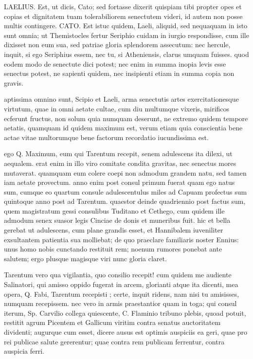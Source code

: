  LAELIUS. Est, ut dicis, Cato; sed fortasse dixerit quispiam tibi propter opes et copias et dignitatem tuam tolerabiliorem senectutem videri, id autem non posse multis contingere. CATO. Est istuc quidem, Laeli, aliquid, sed nequaquam in isto sunt omnia; ut Themistocles fertur Seriphio cuidam in iurgio respondisse, cum ille dixisset non eum sua, sed patriae gloria splendorem assecutum: nec hercule, inquit, si ego Seriphius essem, nec tu, si Atheniensis, clarus umquam fuisses. quod eodem modo de senectute dici potest; nec enim in summa inopia levis esse senectus potest, ne sapienti quidem, nec insipienti etiam in summa copia non gravis.

 aptissima omnino sunt, Scipio et Laeli, arma senectutis artes exercitationesque virtutum, quae in omni aetate cultae, cum diu multumque vixeris, mirificos ecferunt fructus, non solum quia numquam deserunt, ne extremo quidem tempore aetatis, quamquam id quidem maximum est, verum etiam quia conscientia bene actae vitae multorumque bene factorum recordatio iucundissima est.

 ego Q. Maximum, eum qui Tarentum recepit, senem adulescens ita dilexi, ut aequalem. erat enim in illo viro comitate condita gravitas, nec senectus mores mutaverat. quamquam eum colere coepi non admodum grandem natu, sed tamen iam aetate provectum. anno enim post consul primum fuerat quam ego natus sum, cumque eo quartum consule adulescentulus miles ad Capuam profectus sum quintoque anno post ad Tarentum. quaestor deinde quadriennio post factus sum, quem magistratum gessi consulibus Tuditano et Cethego, cum quidem ille admodum senex suasor legis Cinciae de donis et muneribus fuit. hic et bella gerebat ut adulescens, cum plane grandis esset, et Hannibalem iuveniliter exsultantem patientia sua molliebat; de quo praeclare familiaris noster Ennius: unus homo nobis cunctando restituit rem; noenum rumores ponebat ante salutem; ergo plusque magisque viri nunc gloria claret.

 Tarentum vero qua vigilantia, quo consilio recepit! cum quidem me audiente Salinatori, qui amisso oppido fugerat in arcem, glorianti atque ita dicenti, mea opera, Q. Fabi, Tarentum recepisti ; certe, inquit ridens, nam nisi tu amisisses, numquam recepissem. nec vero in armis praestantior quam in toga; qui consul iterum, Sp. Carvilio collega quiescente, C. Flaminio tribuno plebis, quoad potuit, restitit agrum Picentem et Gallicum viritim contra senatus auctoritatem dividenti; augurque cum esset, dicere ausus est optimis auspiciis ea geri, quae pro rei publicae salute gererentur; quae contra rem publicam ferrentur, contra auspicia ferri.

